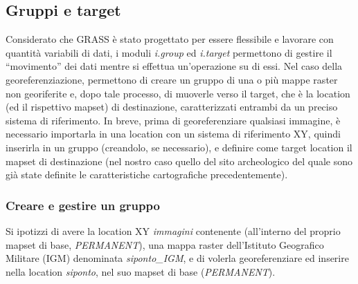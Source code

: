 	\subsection{Gruppi e target}
		Considerato che GRASS è stato progettato per essere flessibile e lavorare con quantità variabili di dati, i moduli \emph{i.group} ed \emph{i.target} permettono di gestire il ``movimento'' dei dati mentre si effettua un'operazione su di essi. Nel caso della georeferenziazione, permettono di creare un gruppo di una o più mappe raster non georiferite e, dopo tale processo, di muoverle verso il target, che è la location (ed il rispettivo mapset) di destinazione, caratterizzati entrambi da un preciso sistema di riferimento. In breve, prima di georeferenziare qualsiasi immagine, è necessario importarla in una location con un sistema di riferimento XY, quindi inserirla in un gruppo (creandolo, se necessario), e definire come target location il mapset di destinazione (nel nostro caso quello del sito archeologico del quale sono già state definite le caratteristiche cartografiche precedentemente).

		\subsubsection{Creare e gestire un gruppo}
			Si ipotizzi di avere la location XY \emph{immagini} contenente (all'interno del proprio mapset di base, \emph{PERMANENT}), una mappa raster dell'Istituto Geografico Militare (IGM) denominata \emph{siponto\_IGM}, e di volerla georeferenziare ed inserire nella location \emph{siponto}, nel suo mapset di base (\emph{PERMANENT}).
			

